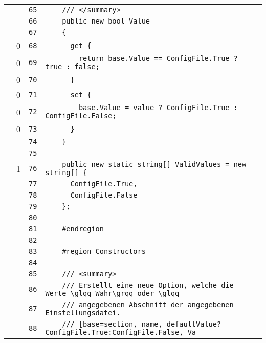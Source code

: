\documentclass[a4paper,10pt]{article}
\begin{document}
\begin{longtable}[l]{lrrl}
\cellcolor{gray} &  & \verb~65~ & \verb~    /// </summary>~\\
\cellcolor{gray} &  & \verb~66~ & \verb~    public new bool Value~\\
\cellcolor{gray} &  & \verb~67~ & \verb~    {~\\
\cellcolor{red} & 0 & \verb~68~ & \verb~      get {~\\
\cellcolor{red} & 0 & \verb~69~ & \verb~        return base.Value == ConfigFile.True ? true : false;~\\
\cellcolor{red} & 0 & \verb~70~ & \verb~      }~\\
\cellcolor{red} & 0 & \verb~71~ & \verb~      set {~\\
\cellcolor{red} & 0 & \verb~72~ & \verb~        base.Value = value ? ConfigFile.True : ConfigFile.False;~\\
\cellcolor{red} & 0 & \verb~73~ & \verb~      }~\\
\cellcolor{gray} &  & \verb~74~ & \verb~    }~\\
\cellcolor{gray} &  & \verb~75~ & \verb~~\\
\cellcolor{green} & 1 & \verb~76~ & \verb~    public new static string[] ValidValues = new string[] {~\\
\cellcolor{gray} &  & \verb~77~ & \verb~      ConfigFile.True,~\\
\cellcolor{gray} &  & \verb~78~ & \verb~      ConfigFile.False~\\
\cellcolor{gray} &  & \verb~79~ & \verb~    };~\\
\cellcolor{gray} &  & \verb~80~ & \verb~~\\
\cellcolor{gray} &  & \verb~81~ & \verb~    #endregion~\\
\cellcolor{gray} &  & \verb~82~ & \verb~~\\
\cellcolor{gray} &  & \verb~83~ & \verb~    #region Constructors~\\
\cellcolor{gray} &  & \verb~84~ & \verb~~\\
\cellcolor{gray} &  & \verb~85~ & \verb~    /// <summary>~\\
\cellcolor{gray} &  & \verb~86~ & \verb~    /// Erstellt eine neue Option, welche die Werte \glqq Wahr\grqq oder \glqq~\\
\cellcolor{gray} &  & \verb~87~ & \verb~    /// angegebenen Abschnitt der angegebenen Einstellungsdatei.~\\
\cellcolor{gray} &  & \verb~88~ & \verb~    /// [base=section, name, defaultValue?ConfigFile.True:ConfigFile.False, Va~\\

\end{longtable}
\end{document}
